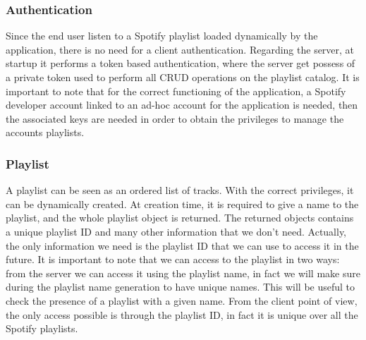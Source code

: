 \documentclass[paper=a4, fontsize=11pt]{scrartcl}
\begin{document}
\subsubsection{Authentication}
Since the end user listen to a Spotify playlist loaded dynamically by the application, there is no need for a client authentication. Regarding the server, at startup it performs a token based authentication, where the server get possess of a private token used to perform all CRUD operations on the playlist catalog.
It is important to note that for the correct functioning of the application, a Spotify developer account linked to an ad-hoc account for the application is needed, then the associated keys are needed in order to obtain the privileges to manage the accounts playlists.
\subsubsection{Playlist}
A playlist can be seen as an ordered list of tracks. With the correct privileges, it can be dynamically created. At creation time, it is required to give a name to the playlist, and the whole playlist object is returned. The returned objects contains a unique playlist ID and many other information that we don't need. Actually, the only information we need is the playlist ID that we can use to access it in the future. It is important to note that we can access to the playlist in two ways: from the server we can access it using the playlist name, in fact we will make sure during the playlist name generation to have unique names. This will be useful to check the presence of a playlist with a given name. From the client point of view, the only access possible is through the playlist ID, in fact it is unique over all the Spotify playlists.
\end{document}
